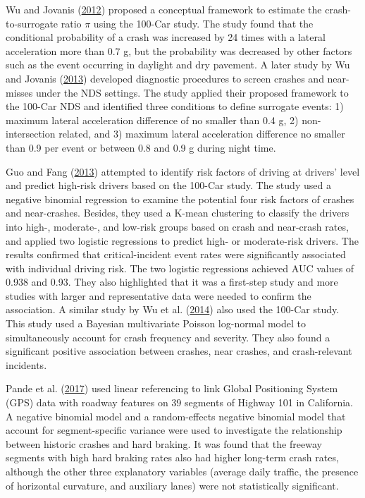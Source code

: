 \documentclass[12pt]{book}
\numberwithin{equation}{chapter}
\begin{document}
Wu and Jovanis (\protect\hyperlink{ref-wu2012crashes}{2012}) proposed a conceptual framework to estimate the crash-to-surrogate ratio \(\pi\) using the 100-Car study. The study found that the conditional probability of a crash was increased by 24 times with a lateral acceleration more than 0.7 g, but the probability was decreased by other factors such as the event occurring in daylight and dry pavement. A later study by Wu and Jovanis (\protect\hyperlink{ref-wu2013defining}{2013}) developed diagnostic procedures to screen crashes and near-misses under the NDS settings. The study applied their proposed framework to the 100-Car NDS and identified three conditions to define surrogate events: 1) maximum lateral acceleration difference of no smaller than 0.4 g, 2) non-intersection related, and 3) maximum lateral acceleration difference no smaller than 0.9 per event or between 0.8 and 0.9 g during night time.

Guo and Fang (\protect\hyperlink{ref-guo2013individual}{2013}) attempted to identify risk factors of driving at drivers' level and predict high-risk drivers based on the 100-Car study. The study used a negative binomial regression to examine the potential four risk factors of crashes and near-crashes. Besides, they used a K-mean clustering to classify the drivers into high-, moderate-, and low-risk groups based on crash and near-crash rates, and applied two logistic regressions to predict high- or moderate-risk drivers. The results confirmed that critical-incident event rates were significantly associated with individual driving risk. The two logistic regressions achieved AUC values of 0.938 and 0.93. They also highlighted that it was a first-step study and more studies with larger and representative data were needed to confirm the association. A similar study by Wu et al. (\protect\hyperlink{ref-wu2014using}{2014}) also used the 100-Car study. This study used a Bayesian multivariate Poisson log-normal model to simultaneously account for crash frequency and severity. They also found a significant positive association between crashes, near crashes, and crash-relevant incidents.

Pande et al. (\protect\hyperlink{ref-pande2017preliminary}{2017}) used linear referencing to link Global Positioning System (GPS) data with roadway features on 39 segments of Highway 101 in California. A negative binomial model and a random-effects negative binomial model that account for segment-specific variance were used to investigate the relationship between historic crashes and hard braking. It was found that the freeway segments with high hard braking rates also had higher long-term crash rates, although the other three explanatory variables (average daily traffic, the presence of horizontal curvature, and auxiliary lanes) were not statistically significant.
\end{document}
